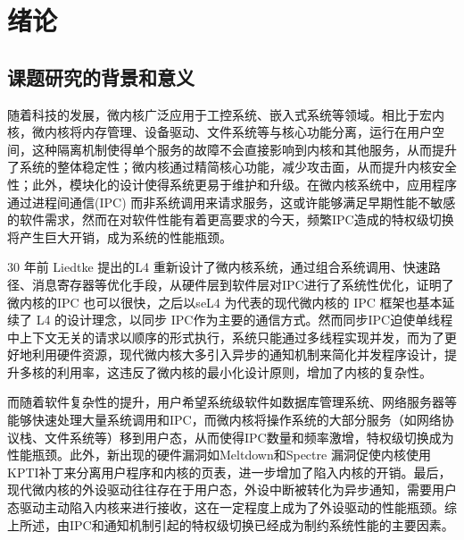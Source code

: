 \chapter{绪论}
\label{chap:intro}
\section{课题研究的背景和意义}

随着科技的发展，微内核广泛应用于工控系统、嵌入式系统等领域\cite{rana2023survey}。相比于宏内核，微内核将内存管理、设备驱动、文件系统等与核心功能分离，运行在用户空间，这种隔离机制使得单个服务的故障不会直接影响到内核和其他服务，从而提升了系统的整体稳定性\cite{Thallapally2024}；微内核通过精简核心功能，减少攻击面，从而提升内核安全性\cite{heiser2008role}；此外，模块化的设计使得系统更易于维护和升级\cite{herder2006construction}。在微内核系统中，应用程序通过进程间通信(IPC) 而非系统调用来请求服务，这或许能够满足早期性能不敏感的软件需求，然而在对软件性能有着更高要求的今天，频繁IPC造成的特权级切换将产生巨大开销，成为系统的性能瓶颈\cite{liedtke1996toward}。

30 年前 Liedtke 提出的L4 \cite{liedtke1993improving} 重新设计了微内核系统，通过组合系统调用、快速路径、消息寄存器等优化手段，从硬件层到软件层对IPC进行了系统性优化，证明了微内核的IPC 也可以很快\cite{jochen1994mu}，之后以seL4 \cite{klein2009sel4} 为代表的现代微内核的 IPC 框架也基本延续了 L4 的设计理念，以同步 IPC作为主要的通信方式。然而同步IPC迫使单线程中上下文无关的请求以顺序的形式执行，系统只能通过多线程实现并发，而为了更好地利用硬件资源，现代微内核大多引入异步的通知机制来简化并发程序设计，提升多核的利用率，这违反了微内核的最小化设计原则，增加了内核的复杂性。

而随着软件复杂性的提升，用户希望系统级软件如数据库管理系统、网络服务器等能够快速处理大量系统调用和IPC\cite{Caruso2021}，而微内核将操作系统的大部分服务（如网络协议栈、文件系统等）移到用户态，从而使得IPC数量和频率激增，特权级切换成为性能瓶颈。此外，新出现的硬件漏洞如Meltdown\cite{lipp2020meltdown}和Spectre\cite{kocher2020spectre} 漏洞促使内核使用 KPTI补丁\cite{kernel_pti}来分离用户程序和内核的页表，进一步增加了陷入内核的开销。最后，现代微内核的外设驱动往往存在于用户态，外设中断被转化为异步通知，需要用户态驱动主动陷入内核来进行接收，这在一定程度上成为了外设驱动的性能瓶颈\cite{blackham2012improving}。综上所述，由IPC和通知机制引起的特权级切换已经成为制约系统性能的主要因素。

